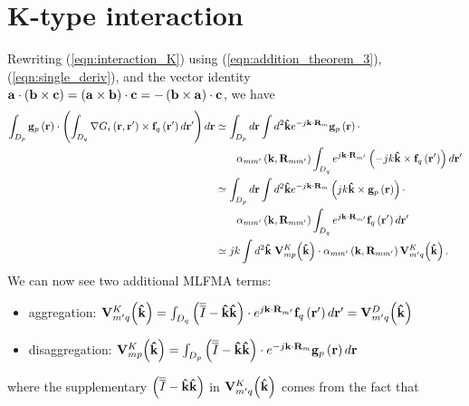 \section{K-type interaction}
%
\par
Rewriting (\ref{eqn:interaction_K}) using (\ref{eqn:addition_theorem_3}), (\ref{eqn:single_deriv}), and the vector identity $\mathbf{a} \cdot \left(\mathbf{b}\times\mathbf{c}\right) = \left(\mathbf{a}\times\mathbf{b}\right) \cdot \mathbf{c} = -\left(\mathbf{b}\times\mathbf{a}\right) \cdot \mathbf{c}$, we have
\begin{equation}
\begin{split}
\int_{D_p} \mathbf{g}_p\left(\mathbf{r}\right) \cdot \left( \int_{D_q} \nabla G_i\left(\mathbf{r}, \mathbf{r}'\right) \times \mathbf{f}_q\left(\mathbf{r}'\right) d\mathbf{r}' \right) d\mathbf{r} &\simeq \int_{D_p}d \mathbf{r} \int d^2\mathbf{\hat{k}} e^{-j\mathbf{k} \cdot \mathbf{R}_{m}}\mathbf{g}_p\left(\mathbf{r}\right) \cdot \\ & \qquad \alpha_{mm'}\left(\mathbf{k}, \mathbf{R}_{mm'}\right) \int_{D_q}  e^{j\mathbf{k} \cdot \mathbf{R}_{m'}} \left(-jk \mathbf{\Hat{k}} \times \mathbf{f}_q\left(\mathbf{r}'\right) \right) d \mathbf{r}' \\
&\simeq \int_{D_p}d \mathbf{r} \int d^2\mathbf{\hat{k}} e^{-j\mathbf{k} \cdot \mathbf{R}_{m}}\left(jk \mathbf{\Hat{k}}\times\mathbf{g}_p\left(\mathbf{r}\right) \right) \cdot \\ & \qquad \alpha_{mm'}\left(\mathbf{k}, \mathbf{R}_{mm'}\right) \int_{D_q}  e^{j\mathbf{k} \cdot \mathbf{R}_{m'}}  \mathbf{f}_q\left(\mathbf{r}'\right) d \mathbf{r}' \\
&\simeq jk \int d^2\mathbf{\hat{k}} \; \mathbf{V}_{mp}^K \! \left(\mathbf{\hat{k}}\right) \cdot \alpha_{mm'}\left(\mathbf{k}, \mathbf{R}_{mm'} \right) \mathbf{V}_{m'q}^K \! \left(\mathbf{\hat{k}}\right).
\end{split}
\end{equation}
We can now see two additional MLFMA terms:
\begin{itemize}
\item aggregation: $\mathbf{V}_{m'q}^K \! \left(\mathbf{\hat{k}}\right) = \int_{D_q} \left( \overline{\overline{I}}-\mathbf{\hat{k}}\mathbf{\hat{k}} \right) \cdot e^{j\mathbf{k} \cdot \mathbf{R}_{m'}} \mathbf{f}_q\left(\mathbf{r}'\right) d \mathbf{r}' = \mathbf{V}_{m'q}^D \! \left(\mathbf{\hat{k}}\right)$
\item disaggregation: $\mathbf{V}_{mp}^K \! \left(\mathbf{\hat{k}}\right) = \int_{D_p} \left( \overline{\overline{I}}-\mathbf{\hat{k}}\mathbf{\hat{k}} \right) \cdot e^{-j\mathbf{k} \cdot \mathbf{R}_{m}} \mathbf{g}_p\left(\mathbf{r}\right) d \mathbf{r}$
\end{itemize}
where the supplementary $\left(\overline{\overline{I}}-\mathbf{\hat{k}}\mathbf{\hat{k}} \right)$ in $\mathbf{V}_{m'q}^K \! \left(\mathbf{\hat{k}}\right)$ comes from the fact that
